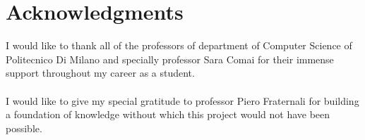 
\bigskip

\begingroup
\let\clearpage\relax
\let\cleardoublepage\relax
\let\cleardoublepage\relax
\chapter*{Acknowledgments}

I would like to thank all of the professors of department of Computer Science of Politecnico Di Milano and specially professor Sara Comai for their immense support throughout my career as a student.
\\ 
\\ 
I would like to give my special gratitude to professor Piero Fraternali for building a foundation of knowledge without which this project would not have been possible. 





\endgroup